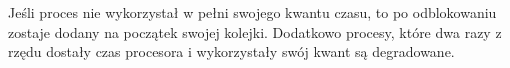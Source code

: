 Jeśli proces nie wykorzystał w pełni swojego kwantu czasu, to po odblokowaniu zostaje dodany na początek swojej kolejki. Dodatkowo procesy, które dwa razy z rzędu dostały czas procesora i wykorzystały swój kwant są degradowane.
